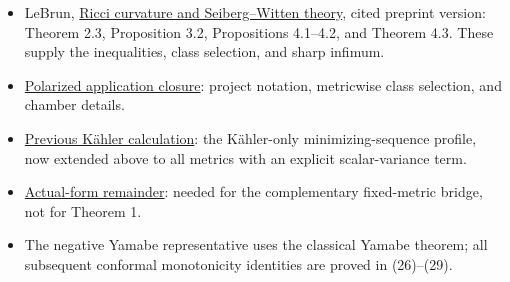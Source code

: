 \documentclass[
  11pt,
]{article}
\providecommand{\tightlist}{%
  \setlength{\itemsep}{0pt}\setlength{\parskip}{0pt}}
\begin{document}
\begin{itemize}
\tightlist
\item
  LeBrun, \href{https://arxiv.org/pdf/math/0003068}{Ricci curvature and
  Seiberg--Witten theory}, cited preprint version: Theorem 2.3,
  Proposition 3.2, Propositions 4.1--4.2, and Theorem 4.3. These supply
  the inequalities, class selection, and sharp infimum.
\item
  \href{lebrun_stability_closure.md}{Polarized application closure}:
  project notation, metricwise class selection, and chamber details.
\item
  \href{line1_kahler_energy.md}{Previous Kähler calculation}: the
  Kähler-only minimizing-sequence profile, now extended above to all
  metrics with an explicit scalar-variance term.
\item
  \href{line1_scalar_band_remainder.md}{Actual-form remainder}: needed
  for the complementary fixed-metric bridge, not for Theorem 1.
\item
  The negative Yamabe representative uses the classical Yamabe theorem;
  all subsequent conformal monotonicity identities are proved in
  (26)--(29).
\end{itemize}
\end{document}
